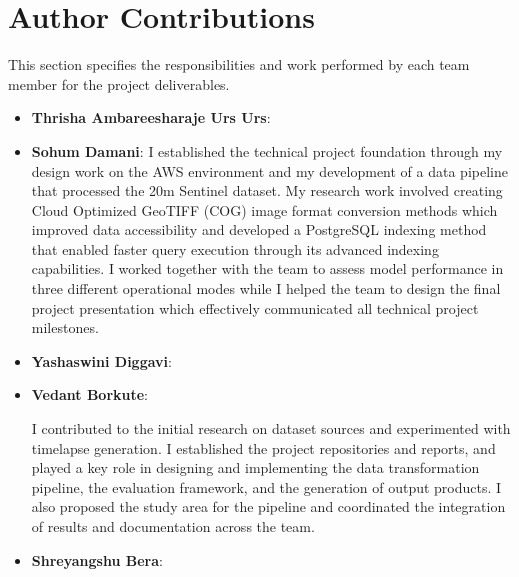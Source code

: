 \newpage
\section{Author Contributions}
This section specifies the responsibilities and work performed by each team member for the project deliverables.

\begin{itemize}
    \item \textbf{Thrisha Ambareesharaje Urs Urs}: 
    \item \textbf{Sohum Damani}: I established the technical project foundation through my design work on the AWS environment and my development of a data pipeline that processed the 20m Sentinel dataset. My research work involved creating Cloud Optimized GeoTIFF (COG) image format conversion methods which improved data accessibility and developed a PostgreSQL indexing method that enabled faster query execution through its advanced indexing capabilities. I worked together with the team to assess model performance in three different operational modes while I helped the team to design the final project presentation which effectively communicated all technical project milestones. 
    \item \textbf{Yashaswini Diggavi}: 
    \item \textbf{Vedant Borkute}: 

    I contributed to the initial research on dataset sources and experimented with timelapse generation. I established the project repositories and reports, and played a key role in designing and implementing the data transformation pipeline, the evaluation framework, and the generation of output products. I also proposed the study area for the pipeline and coordinated the integration of results and documentation across the team.
    \item \textbf{Shreyangshu Bera}: 
\end{itemize}
